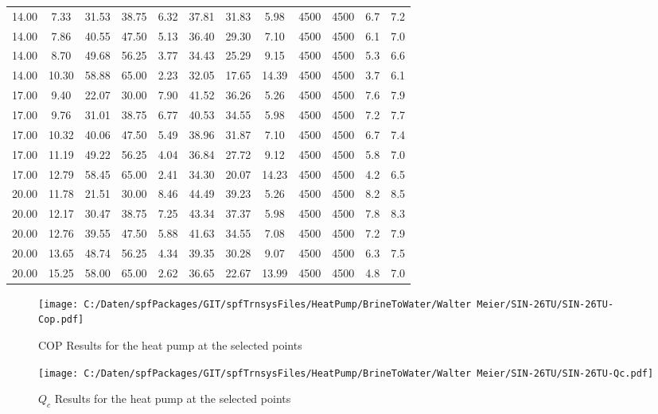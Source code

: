 \documentclass[english]{SPFShortReport}
\begin{document}
\begin{table}[!ht]
\begin{small}
\begin{center}
{\begin{tabular}{l | c c c c c c c c c c c }
14.00 & 7.33 & 31.53 & 38.75 & 6.32 & 37.81 & 31.83 & 5.98 & 4500 & 4500 & 6.7 & 7.2\\ 
14.00 & 7.86 & 40.55 & 47.50 & 5.13 & 36.40 & 29.30 & 7.10 & 4500 & 4500 & 6.1 & 7.0\\ 
14.00 & 8.70 & 49.68 & 56.25 & 3.77 & 34.43 & 25.29 & 9.15 & 4500 & 4500 & 5.3 & 6.6\\ 
14.00 & 10.30 & 58.88 & 65.00 & 2.23 & 32.05 & 17.65 & 14.39 & 4500 & 4500 & 3.7 & 6.1\\ 
17.00 & 9.40 & 22.07 & 30.00 & 7.90 & 41.52 & 36.26 & 5.26 & 4500 & 4500 & 7.6 & 7.9\\ 
17.00 & 9.76 & 31.01 & 38.75 & 6.77 & 40.53 & 34.55 & 5.98 & 4500 & 4500 & 7.2 & 7.7\\ 
17.00 & 10.32 & 40.06 & 47.50 & 5.49 & 38.96 & 31.87 & 7.10 & 4500 & 4500 & 6.7 & 7.4\\ 
17.00 & 11.19 & 49.22 & 56.25 & 4.04 & 36.84 & 27.72 & 9.12 & 4500 & 4500 & 5.8 & 7.0\\ 
17.00 & 12.79 & 58.45 & 65.00 & 2.41 & 34.30 & 20.07 & 14.23 & 4500 & 4500 & 4.2 & 6.5\\ 
20.00 & 11.78 & 21.51 & 30.00 & 8.46 & 44.49 & 39.23 & 5.26 & 4500 & 4500 & 8.2 & 8.5\\ 
20.00 & 12.17 & 30.47 & 38.75 & 7.25 & 43.34 & 37.37 & 5.98 & 4500 & 4500 & 7.8 & 8.3\\ 
20.00 & 12.76 & 39.55 & 47.50 & 5.88 & 41.63 & 34.55 & 7.08 & 4500 & 4500 & 7.2 & 7.9\\ 
20.00 & 13.65 & 48.74 & 56.25 & 4.34 & 39.35 & 30.28 & 9.07 & 4500 & 4500 & 6.3 & 7.5\\ 
20.00 & 15.25 & 58.00 & 65.00 & 2.62 & 36.65 & 22.67 & 13.99 & 4500 & 4500 & 4.8 & 7.0\\ 
\hline
\hline
\end{tabular}
}
\label{ResultsTable}
\end{center}
\end{small}
\end{table}
\begin{figure}[!ht]
\begin{center}
\texttt{[image: C:/Daten/spfPackages/GIT/spfTrnsysFiles/HeatPump/BrineToWater/Walter Meier/SIN-26TU/SIN-26TU-Cop.pdf]}
\caption{COP Results for the heat pump at the selected points}
\label{COPFig}
\end{center}
\end{figure}
\begin{figure}[!ht]
\begin{center}
\texttt{[image: C:/Daten/spfPackages/GIT/spfTrnsysFiles/HeatPump/BrineToWater/Walter Meier/SIN-26TU/SIN-26TU-Qc.pdf]}
\caption{$Q_c$ Results for the heat pump at the selected points}
\label{QcFig}
\end{center}
\end{figure}
\end{document}
